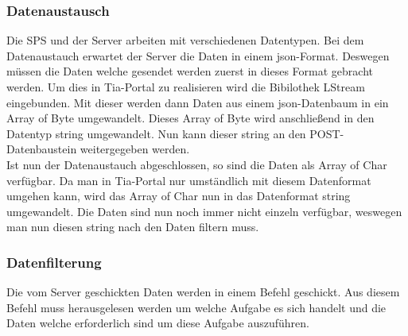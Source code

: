     \subsubsection{Datenaustausch}
    Die SPS und der Server arbeiten mit verschiedenen Datentypen. Bei dem Datenaustauch erwartet der Server die Daten in einem json-Format. Deswegen müssen die Daten welche gesendet werden zuerst in dieses Format gebracht werden. Um dies in Tia-Portal zu realisieren wird die Bibilothek LStream eingebunden. Mit dieser werden dann Daten aus einem json-Datenbaum in ein Array of Byte umgewandelt. Dieses Array of Byte wird anschließend in den Datentyp string umgewandelt. Nun kann dieser string an den POST-Datenbaustein weitergegeben werden. \\
    Ist nun der Datenaustauch abgeschlossen, so sind die Daten als Array of Char verfügbar. Da man in Tia-Portal nur umständlich mit diesem Datenformat umgehen kann, wird das Array of Char nun in das Datenformat string umgewandelt. Die Daten sind nun noch immer nicht einzeln verfügbar, weswegen man nun diesen string nach den Daten filtern muss.

    \subsubsection{Datenfilterung}
    Die vom Server geschickten Daten werden in einem Befehl geschickt. Aus diesem Befehl muss herausgelesen werden um welche Aufgabe es sich handelt  und die Daten welche erforderlich sind um diese Aufgabe auszuführen.

